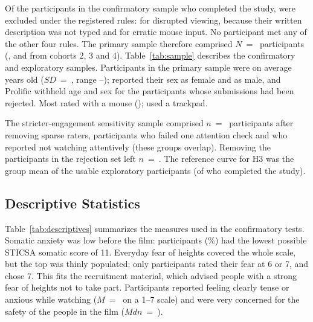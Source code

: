 \documentclass[man,floatsintext,12pt,donotrepeattitle]{apa7}
\begin{document}
Of the  participants in the confirmatory sample who completed the study,  were
excluded under the registered rules:  for disrupted viewing,  because
their written description was not typed and  for erratic mouse input. No participant met any of
the other four rules. The primary sample therefore comprised $N$~=~ participants (,
 and  from cohorts 2, 3 and 4). Table~\ref{tab:sample} describes the
confirmatory and exploratory samples. Participants in the primary sample were on average  years old
($SD$~=~, range --);  reported their sex as female and
 as male, and Prolific withheld age and sex for the  participants whose submissions
had been rejected. Most rated with a mouse ();  used a trackpad.



The stricter-engagement sensitivity sample comprised $n$~=~ participants after removing
 sparse raters,  participants who failed one attention check and
 who reported not watching attentively (these groups overlap). Removing the
 participants in the rejection set left $n$~=~. The reference curve for
H3 was the group mean of the  usable exploratory participants (of 
who completed the study).

\subsection{Descriptive Statistics}

Table~\ref{tab:descriptives} summarizes the measures used in the confirmatory tests. Somatic anxiety was low before
the film:  participants (\%) had the lowest possible STICSA somatic score of 11.
Everyday fear of heights covered the whole scale, but the top was thinly populated; only 
participants rated their fear at 6 or 7, and  chose 7. This fits the recruitment material, which
advised people with a strong fear of heights not to take part. Participants reported feeling clearly tense or
anxious while watching ($M$~=~ on a 1--7 scale) and were very concerned for the safety of
the people in the film ($Mdn$~=~).
\end{document}
